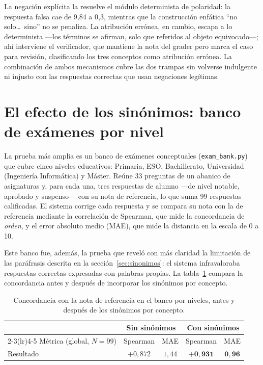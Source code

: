 La negación explícita la resuelve el módulo determinista de polaridad: la respuesta falsa cae de 9{,}84 a 0{,}3, mientras que la construcción enfática ``no solo\dots\ sino'' no se penaliza. La atribución errónea, en cambio, escapa a lo determinista —los términos se afirman, solo que referidos al objeto equivocado—; ahí interviene el verificador, que mantiene la nota del grader pero marca el caso para revisión, clasificando los tres conceptos como atribución errónea. La combinación de ambos mecanismos cubre las dos trampas sin volverse indulgente ni injusto con las respuestas correctas que usan negaciones legítimas.

\section{El efecto de los sinónimos: banco de exámenes por nivel}

La prueba más amplia es un banco de exámenes conceptuales (\texttt{exam\_bank.py}) que cubre cinco niveles educativos: Primaria, ESO, Bachillerato, Universidad (Ingeniería Informática) y Máster. Reúne 33 preguntas de un abanico de asignaturas y, para cada una, tres respuestas de alumno —de nivel notable, aprobado y suspenso— con su nota de referencia, lo que suma 99 respuestas calificadas. El sistema corrige cada respuesta y se compara su nota con la de referencia mediante la correlación de Spearman, que mide la concordancia de \emph{orden}, y el error absoluto medio (MAE), que mide la distancia en la escala de 0 a 10.

Este banco fue, además, la prueba que reveló con más claridad la limitación de las paráfrasis descrita en la sección~\ref{sec:sinonimos}: el sistema infravaloraba respuestas correctas expresadas con palabras propias. La tabla~\ref{tab:banco} compara la concordancia antes y después de incorporar los sinónimos por concepto.

\begin{table}[ht]
\centering
\caption{Concordancia con la nota de referencia en el banco por niveles, antes y después de los sinónimos por concepto.}
\label{tab:banco}
\small
\begin{tabular}{lcccc}
\toprule
 & \multicolumn{2}{c}{Sin sinónimos} & \multicolumn{2}{c}{Con sinónimos} \\
\cmidrule(lr){2-3}\cmidrule(lr){4-5}
Métrica (global, $N=99$) & Spearman & MAE & Spearman & MAE \\
\midrule
Resultado & $+0{,}872$ & $1{,}44$ & $\mathbf{+0{,}931}$ & $\mathbf{0{,}96}$ \\
\bottomrule
\end{tabular}
\end{table}

